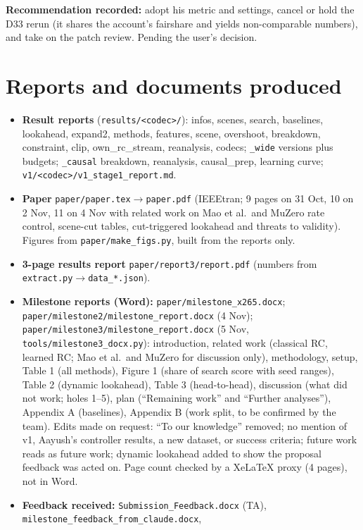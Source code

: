\documentclass[10pt,a4paper]{article}
\newcommand{\code}[1]{\texttt{\small #1}}
\begin{document}
\textbf{Recommendation recorded:} adopt his metric and settings, cancel or hold the D33 rerun (it shares the account's
fairshare and yields non-comparable numbers), and take on the patch review. Pending the user's decision.

\section{Reports and documents produced}
\begin{itemize}
\item \textbf{Result reports} (\code{results/<codec>/}): infos, scenes, search, baselines, lookahead, expand2, methods,
features, scene, overshoot, breakdown, constraint, clip, own\_rc\_stream, reanalysis, codecs; \code{\_wide} versions
plus budgets; \code{\_causal} breakdown, reanalysis, causal\_prep, learning curve; \code{v1/<codec>/v1\_stage1\_report.md}.
\item \textbf{Paper} \code{paper/paper.tex}$\to$\code{paper.pdf} (IEEEtran; 9 pages on 31 Oct, 10 on 2 Nov, 11 on 4 Nov
with related work on Mao et al.\ and MuZero rate control, scene-cut tables, cut-triggered lookahead and threats to
validity). Figures from \code{paper/make\_figs.py}, built from the reports only.
\item \textbf{3-page results report} \code{paper/report3/report.pdf} (numbers from \code{extract.py}$\to$\code{data\_*.json}).
\item \textbf{Milestone reports (Word):} \code{paper/milestone\_x265.docx}; \code{paper/milestone2/milestone\_report.docx}
(4 Nov); \code{paper/milestone3/milestone\_report.docx} (5 Nov, \code{tools/milestone3\_docx.py}): introduction,
related work (classical RC, learned RC; Mao et al.\ and MuZero for discussion only), methodology, setup, Table 1 (all
methods), Figure 1 (share of search score with seed ranges), Table 2 (dynamic lookahead), Table 3 (head-to-head),
discussion (what did not work; holes 1--5), plan (``Remaining work'' and ``Further analyses''), Appendix A
(baselines), Appendix B (work split, to be confirmed by the team). Edits made on request: ``To our knowledge''
removed; no mention of v1, Aayush's controller results, a new dataset, or success criteria; future work reads as
future work; dynamic lookahead added to show the proposal feedback was acted on. Page count checked by a XeLaTeX
proxy (4 pages), not in Word.
\item \textbf{Feedback received:} \code{Submission\_Feedback.docx} (TA), \code{milestone\_feedback\_from\_claude.docx},

\end{itemize}
\end{document}
